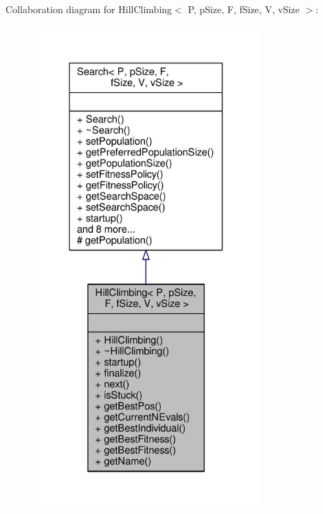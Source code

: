 Collaboration diagram for Hill\+Climbing$<$ P, p\+Size, F, f\+Size, V, v\+Size $>$\+:
\nopagebreak
\begin{figure}[H]
\begin{center}
\leavevmode
\includegraphics[width=247pt]{classHillClimbing__coll__graph}
\end{center}
\end{figure}
